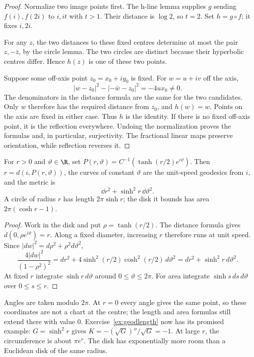 \begin{proof}
Normalize two image points first. The h-line lemma supplies $g$ sending $f(i),f(2i)$ to $i,it$ with $t>1$. Their distance is $\log2$, so $t=2$. Set $h=g\circ f$; it fixes $i,2i$.

For any $z$, the two distances to these fixed centres determine at most the pair $z,-\bar z$, by the circle lemma. The two circles are distinct because their hyperbolic centres differ. Hence $h(z)$ is one of these two points.

Suppose some off-axis point $z_0=x_0+iy_0$ is fixed. For $w=u+iv$ off the axis,
\[
|w-z_0|^2-|-\bar w-z_0|^2=-4ux_0\ne0.
\]
The denominators in the distance formula are the same for the two candidates. Only $w$ therefore has the required distance from $z_0$, and $h(w)=w$. Points on the axis are fixed in either case. Thus $h$ is the identity. If there is no fixed off-axis point, it is the reflection everywhere. Undoing the normalization proves the formulas and, in particular, surjectivity. The fractional linear maps preserve orientation, while reflection reverses it.
\end{proof}

\begin{proposition}\label{prop:hyppolar}
For $r>0$ and $\vartheta\in\R$, set $P(r,\vartheta)=C^{-1}(\tanh(r/2)e^{i\vartheta})$. Then $r=d(i,P(r,\vartheta))$, the curves of constant $\vartheta$ are the unit-speed geodesics from $i$, and the metric is
\[
\dd r^2+\sinh^2r\,\dd\vartheta^2.
\]
A circle of radius $r$ has length $2\pi\sinh r$; the disk it bounds has area $2\pi(\cosh r-1)$.
\end{proposition}

\begin{proof}
Work in the disk and put $\rho=\tanh(r/2)$. The distance formula gives $d(0,\rho e^{i\vartheta})=r$. Along a fixed diameter, increasing $r$ therefore runs at unit speed. Since $|dw|^2=d\rho^2+\rho^2d\vartheta^2$,
\[
\frac{4|dw|^2}{(1-\rho^2)^2}
=dr^2+4\sinh^2(r/2)\cosh^2(r/2)\,d\vartheta^2
=dr^2+\sinh^2r\,d\vartheta^2.
\]
At fixed $r$ integrate $\sinh r\,d\vartheta$ around $0\le\vartheta\le2\pi$. For area integrate $\sinh s\,ds\,d\vartheta$ over $0\le s\le r$.
\end{proof}

Angles are taken modulo $2\pi$. At $r=0$ every angle gives the same point, so these coordinates are not a chart at the centre; the length and area formulas still extend there with value $0$. Exercise~\ref{ex:geodlength} now has its promised example: $G=\sinh^2r$ gives $K=-(\sqrt G)''/\sqrt G=-1$. At large $r$, the circumference is about $\pi e^r$. The disk has exponentially more room than a Euclidean disk of the same radius.

